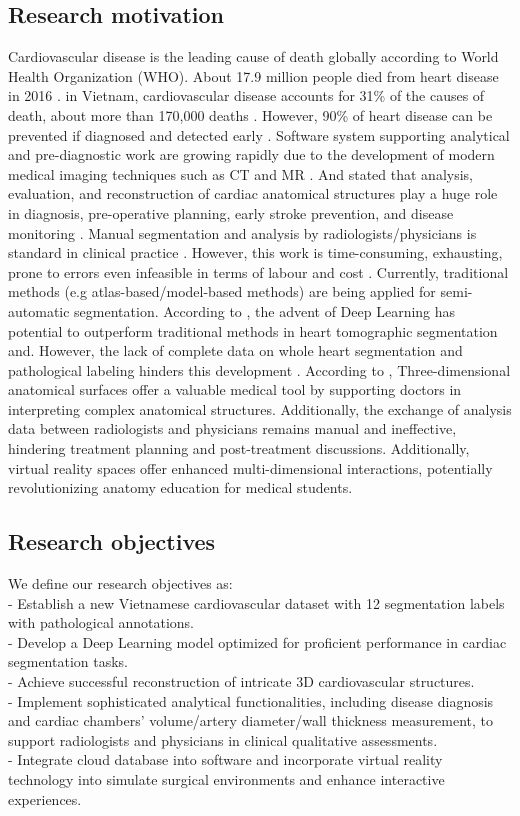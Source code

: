 \documentclass{article}
\begin{document}
\begin{multicols}{2}
\subsection{Research motivation}
Cardiovascular disease is the leading cause of death globally according to World Health Organization (WHO). About 17.9 million people died from heart disease in 2016 \cite{who}. in Vietnam, cardiovascular disease accounts for 31\% of the causes of death, about more than 170,000 deaths \cite{stanford}. However, 90\% of heart disease can be prevented if diagnosed and detected early \cite{prevent}. Software system supporting analytical and pre-diagnostic work are growing rapidly due to the development of modern medical imaging techniques such as CT and MR \cite{contour}. And \cite{short_axis, left_ventricle, right_ventricle} stated that analysis, evaluation, and reconstruction of cardiac anatomical structures play a huge role in diagnosis, pre-operative planning, early stroke prevention, and disease monitoring \cite{deep_review}. Manual segmentation and analysis by radiologists/physicians is standard in clinical practice \cite{tran, deformable}. However, this work is time-consuming, exhausting, prone to errors \cite{tran, left_ventricle} even infeasible in terms of labour and cost \cite{retrieval}. Currently, traditional  methods (e.g atlas-based/model-based methods) are being applied for semi-automatic segmentation. According to \cite{deep_review}, the advent of Deep Learning has potential to outperform traditional methods in heart tomographic segmentation and. However, the lack of complete data on whole heart segmentation and pathological labeling hinders this development \cite{left_ventricle}. According to \cite{loren}, Three-dimensional anatomical surfaces offer a valuable medical tool by supporting doctors in interpreting complex anatomical structures. Additionally, the exchange of analysis data between radiologists and physicians remains manual and ineffective, hindering treatment planning and post-treatment discussions. Additionally, virtual reality spaces offer enhanced multi-dimensional interactions, potentially revolutionizing anatomy education for medical students.
\subsection{Research objectives}
We define our research objectives as: \\
- Establish a new Vietnamese cardiovascular dataset with 12 segmentation labels with pathological annotations.\\
- Develop a Deep Learning model optimized for proficient performance in cardiac segmentation tasks.\\
- Achieve successful reconstruction of intricate 3D cardiovascular structures. \\
- Implement sophisticated analytical functionalities, including disease diagnosis and cardiac chambers' volume/artery diameter/wall thickness measurement, to support radiologists and physicians in clinical qualitative assessments.\\
- Integrate cloud database into software and incorporate virtual reality technology into simulate surgical environments and enhance interactive experiences.

\end{multicols}
\end{document}
